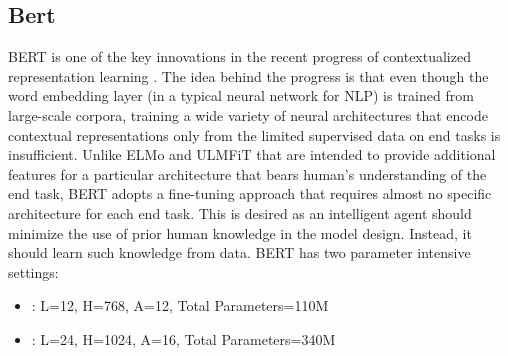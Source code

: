 \subsection{Bert}









BERT is one of the key innovations in the recent progress of contextualized representation learning \cite{peters2018deep,howard2018universal,devlin2018bert}.
The idea behind the progress is that even though the word embedding layer (in a typical neural network for NLP) is trained from large-scale corpora, training a wide variety of neural architectures that encode contextual representations only from the limited supervised data on end tasks is insufficient.
Unlike ELMo \cite{peters2018deep} and ULMFiT \cite{howard2018universal} that are intended to provide additional features for a particular architecture that bears human's understanding of the end task, BERT adopts a fine-tuning approach that requires almost no specific architecture for each end task. This is desired as an intelligent agent should minimize the use of prior human knowledge in the model design. Instead, it should learn such knowledge from data. BERT has two parameter intensive settings: 


\begin{itemize}
    \item {\bf \bertbase}: L=12, H=768, A=12, Total Parameters=110M
    \item {\bf \bertlarge}: L=24, H=1024, A=16, Total Parameters=340M
\end{itemize}